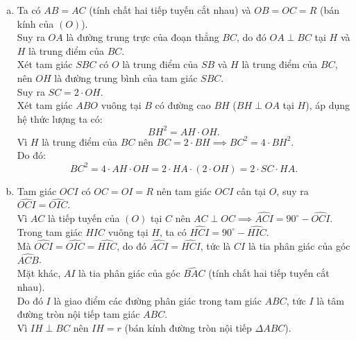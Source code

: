 \begin{bt}
{\begin{center}
\end{center}
\begin{enumerate}[a)]
	\item Ta có $AB = AC$ (tính chất hai tiếp tuyến cắt nhau) và $OB = OC = R$ (bán kính của $(O)$).\\
	Suy ra $OA$ là đường trung trực của đoạn thẳng $BC$, do đó $OA \perp BC$ tại $H$ và $H$ là trung điểm của $BC$.\\
	Xét tam giác $SBC$ có $O$ là trung điểm của $SB$ và $H$ là trung điểm của $BC$, nên $OH$ là đường trung bình của tam giác $SBC$.\\
	Suy ra $SC = 2 \cdot OH$.\\
	Xét tam giác $ABO$ vuông tại $B$ có đường cao $BH$ ($BH \perp OA$ tại $H$), áp dụng hệ thức lượng ta có:
	$$BH^2 = AH \cdot OH.$$
	Vì $H$ là trung điểm của $BC$ nên $BC = 2 \cdot BH \implies BC^2 = 4 \cdot BH^2$.\\
	Do đó:
	$$BC^2 = 4 \cdot AH \cdot OH = 2 \cdot HA \cdot (2 \cdot OH) = 2 \cdot SC \cdot HA.$$
	\item Tam giác $OCI$ có $OC = OI = R$ nên tam giác $OCI$ cân tại $O$, suy ra $\widehat{OCI} = \widehat{OIC}$.\\
	Vì $AC$ là tiếp tuyến của $(O)$ tại $C$ nên $AC \perp OC \implies \widehat{ACI} = 90^\circ - \widehat{OCI}$.\\
	Trong tam giác $HIC$ vuông tại $H$, ta có $\widehat{HCI} = 90^\circ - \widehat{HIC}$.\\
	Mà $\widehat{OCI} = \widehat{OIC} = \widehat{HIC}$, do đó $\widehat{ACI} = \widehat{HCI}$, tức là $CI$ là tia phân giác của góc $\widehat{ACB}$.\\
	Mặt khác, $AI$ là tia phân giác của góc $\widehat{BAC}$ (tính chất hai tiếp tuyến cắt nhau).\\
	Do đó $I$ là giao điểm các đường phân giác trong tam giác $ABC$, tức $I$ là tâm đường tròn nội tiếp tam giác $ABC$.\\
	Vì $IH \perp BC$ nên $IH = r$ (bán kính đường tròn nội tiếp $\Delta ABC$).\\

\end{enumerate}}
\end{bt}
